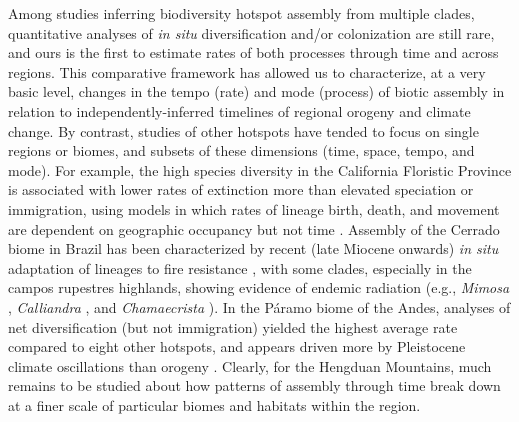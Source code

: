 


Among studies inferring biodiversity hotspot assembly from multiple
clades, quantitative analyses of \textit{in situ} diversification
and/or colonization are still rare, and ours is the first to estimate
rates of both processes through time and across regions. This
comparative framework has allowed us to characterize, at a very basic
level, changes in the tempo (rate) and mode (process) of biotic
assembly in relation to independently-inferred timelines of regional
orogeny and climate change. By contrast, studies of other hotspots
have tended to focus on single regions or biomes, and subsets of these
dimensions (time, space, tempo, and mode). For example, the high
species diversity in the California Floristic Province is associated
with lower rates of extinction more than elevated speciation or
immigration, using models in which rates of lineage birth, death, and
movement are dependent on geographic occupancy but not time
\citep{lancaster2013}. Assembly of the Cerrado biome in Brazil has
been characterized by recent (late Miocene onwards) \textit{in situ}
adaptation of lineages to fire resistance \citep{simon2009}, with some
clades, especially in the campos rupestres highlands, showing evidence
of endemic radiation (e.g., \textit{Mimosa}
\citep{koenen2013,simon2009}, \textit{Calliandra} \citep{souza2013},
and \textit{Chamaecrista} \citep{rando2015}). In the Páramo biome of
the Andes, analyses of net diversification (but not immigration)
yielded the highest average rate compared to eight other hotspots, and
appears driven more by Pleistocene climate oscillations than orogeny
\citep{Madrinan2013}. Clearly, for the Hengduan Mountains, much
remains to be studied about how patterns of assembly through time
break down at a finer scale of particular biomes and habitats within
the region.

